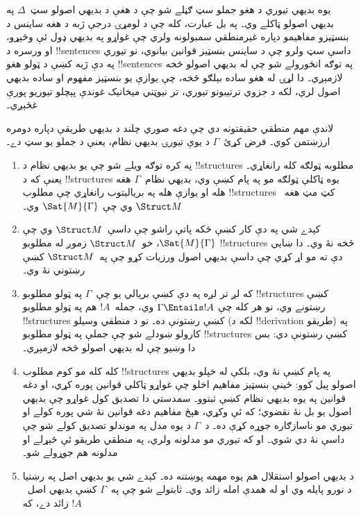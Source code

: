 \documentclass[../../../include/open-logic-section]{subfiles}
\begin{document}
\begin{explain}
يوه بديهي تيوري د هغو جملو سټ ګڼلے شو چې د هغې د بديهي اصولو
سټ~$\Delta$ په بديهي اصولو ټاکلے وي۔ په بل عبارت، کله چې د لومړۍ درجې ژبه د هغه
ساينس د بنسټيزو مفاهيمو دپاره غيرمنطقي سمبولونه ولري چې غواړو په
بديهي ډول ئې وڅېړو، او ورسره د !!{sentence}s داسې سټ ولرو چې د
ساينس بنسټيز قوانين بيانوي، نو تيوري په دې ژبه کښې د ټولو هغو
!!{sentence}s په توګه انځورولے شو چې له بديهي اصولو څخه لازمېږي۔
دا لړۍ له هغو ساده بېلګو څخه، چې يوازې يو بنسټيز مفهوم او ساده
بديهي اصول لري، لکه د جزوي ترتيبونو تيوري، تر نيوټني ميخانيک غوندې
پېچلو تيوريو پورې غځېږي۔

لاندې مهم منطقي حقيقتونه دي چې دغه صوري چلند د بديهي طريقې دپاره
دومره ارزښتمن کوي۔ فرض کړئ~$\Gamma$ د يوې تيورۍ بديهي نظام، يعنې د
جملو يو سټ دے۔
\begin{enumerate}
\item په کره توګه ويلے شو چې يو بديهي نظام د !!{structure}s مطلوبه
  ټولګه کله رانغاړي۔ يعنې که د !!{structure}s يوه ټاکلې ټولګه مو په
  پام کښې وي، بديهي نظام~$\Gamma$ هغه هله او يوازې هله په برياليتوب
  رانغاړي چې مطلوب !!{structure}s کټ مټ هغه~$\Struct M$ وي چې
  $\Sat{M}{\Gamma}$ وي۔
\item کېدے شي په دې کار کښې ځکه پاتې راشو چې داسې~$\Struct M$ وي
  چې $\Sat{M}{\Gamma}$، خو~$\Struct M$ زموږ له مطلوبو
  !!{structure}s څخه نۀ وي۔ دا ښايي دې ته مو اړ کړي چې داسې بديهي
  اصول ورزيات کړو چې په~$\Struct M$ کښې رښتوني نۀ وي۔
\item که لږ تر لږه په دې کښې بريالي يو چې~$\Gamma$ په ټولو مطلوبو
  !!{structure}s کښې رښتونے وي، نو هر کله چې
  $\Gamma \Entails !A$ وي، جمله~$!A$ هم په ټولو مطلوبو
  !!{structure}s کښې رښتونې ده۔ نو د منطقي وسيلو (لکه د
  !!{derivation} طريقو) په کارولو ښودلے شو چې جملې په ټولو مطلوبو
  !!{structure}s کښې رښتونې دي: بس دا وښيو چې له بديهي اصولو څخه
  لازمېږي۔
\item کله کله مو کوم مطلوب !!{structure}s په پام کښې نۀ وي، بلکې
  له خپلو بديهي اصولو پيل کوو: ځينې بنسټيز مفاهيم اخلو چې غواړو
  ټاکلي قوانين پوره کړي، او دغه قوانين په يوه بديهي نظام کښې ثبتوو۔
  سمدستي دا تصديق کول غواړو چې بديهي اصول يو بل نۀ نقضوي؛ که ئې
  وکړي، هېڅ مفاهيم دغه قوانين نۀ شي پوره کولے او تيوري مو ناسازګاره
  جوړه کړې ده۔ د~$\Gamma$ د يوه مدل په موندلو تصديق کولے شو چې داسې
  نۀ دي شوي۔ او که تيوري مو مدلونه ولري، په منطقي طريقو ئې څېړلے او
  مدلونه هم جوړولے شو۔
\item د بديهي اصولو استقلال هم يوه مهمه پوښتنه ده۔ کېدے شي يو بديهي
  اصل په رښتيا د نورو پايله وي او له همدې امله زائد وي۔ ثابتولے شو
  چې په~$\Gamma$ کښې بديهي اصل~$!A$ زائد دے، که

\end{enumerate}
\end{explain}
\end{document}
